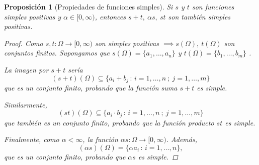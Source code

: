 \documentclass[11pt, a4paper]{article}
\theoremstyle{theorem-style}
\newtheorem{nprop}{Proposición}[section]
\theoremstyle{definition-style}
\theoremstyle{remark-style}
\theoremstyle{example-style}
\begin{document}
\begin{nprop}[Propiedades de funciones simples] \label{propsimples}
  Si $s$ y $t$ son funciones simples positivas y $\alpha \in [0,\infty)$, entonces $s+t, \ \alpha s, \ st$ son también simples positivas.
  
  \begin{proof}
    Como $s,t: \Omega \longrightarrow [0,\infty)$ son simples positivas $\implies s(\Omega) , \ t(\Omega)$ son conjuntos finitos. Supongamos que $s(\Omega) =\{ a_1, \dots ,a_n\}$  y $t(\Omega) = \{ b_1, \dots ,b_m\}$ . 

    La imagen por $s+ t$ sería
    $$(s+t)(\Omega) \subseteq \{ a_i + b_j \, :\, i=1,\dots ,n \ ; \ j=1,\dots ,m\}$$
    que es un conjunto finito, probando que la función suma $s+t$ es simple.

    Similarmente, $$(st)(\Omega ) \subseteq \{ a_i \cdot b_j \, : \, i=1,\dots ,n \ ; \ j=1,\dots ,m \}$$
    que también es un conjunto finito, probando que la función producto $st$ es simple.

    Finalmente, como $\alpha< \infty$, la función $\alpha s:\Omega \longrightarrow [0,\infty)$. Además, 
    $$(\alpha s)(\Omega) = \{ \alpha a_i \,:\, i=1,\dots ,n \},$$
    que es un  conjunto finito, probando que $\alpha s$ es simple.
  \end{proof}
\end{nprop}
\end{document}
